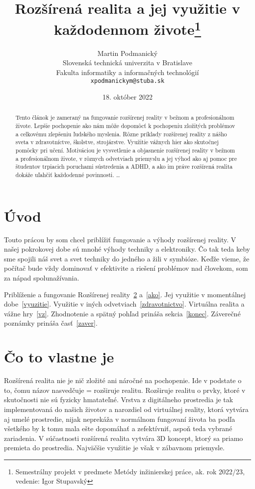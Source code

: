 \documentclass[10pt,twoside,a4paper]{article}
\title{Rozšírená realita a jej využitie v každodennom živote\thanks{Semestrálny projekt v predmete Metódy inžinierskej práce, ak. rok 2022/23, vedenie: Igor Stupavský}} %
\author{Martin Podmanický\\[2pt]
	{\small Slovenská technická univerzita v Bratislave}\\
	{\small Fakulta informatiky a informačných technológií}\\
	{\small \texttt{xpodmanickym@stuba.sk}}
	}
\date{\small 18. október 2022} %
\begin{document}
\maketitle

\begin{abstract}
Tento článok je zameraný na fungovanie rozšírenej reality v bežnom a profesionálnom živote. Lepšie pochopenie ako nám môže dopomôcť k pochopeniu zložitých problémov a celkovému zlepšeniu ľudského myslenia. Rôzne príklady rozšírenej reality z nášho sveta v zdravotníctve, školstve, strojárstve. Využitie vážnych hier ako skutočnej pomôcky pri učení. Motiváciou je vysvetlenie a objasnenie rozšírenej reality v bežnom a profesionálnom živote, v rôznych odvetviach priemyslu a jej výhod ako aj pomoc pre študentov trpiacich poruchami sústredenia a ADHD, a ako im práve rozšírená realita dokáže uľahčiť každodenné povinnosti.
\ldots
\end{abstract}



\section{Úvod}

Touto prácou by som chcel priblížiť fungovanie a výhody rozšírenej reality. V našej pokrokovej dobe sú mnohé výhody techniky a elektroniky.
Čo tak teda keby sme spojili náš svet a svet techniky do jedného a žili v symbióze. Keďže vieme, že počítač bude vždy dominovať v efektivite a riešení problémov nad človekom,
som za nápad spolunažívania.


Priblíženie a fungovanie Rozšírenej reality~\ref{co} a~\ref{ako}.
Jej využitie v momentálnej dobe~\ref{vyuzitie}.
Využitie v iných odvetviach~\ref{zdravotnictvo}.
Virtuálna realita a vážne hry~\ref{vz}.
Zhodnotenie a spätný pohľad prináša sekcia~\ref{konec}.
Záverečné poznámky prináša časť~\ref{zaver}.



\section{Čo to vlastne je} \label{co}

Rozšírená realita nie je nič zložité ani náročné na pochopenie. Ide v podstate o to, čomu názov nasvedčuje = rozširuje realitu. Rozširuje realitu o prvky, ktoré v skutočnosti nie sú fyzicky hmatateľné. Vrstva z digitálneho prostredia je tak implementovaná do našich životov a narozdiel od virtuálnej reality, ktorá vytvára aj umelé prostredie, nijak neprekáža v normálnom fungovaní života ba podľa všetkého by k tomu mala ešte dopomáhať a zefektívniť, aspoň teda vybrané zariadenia. V súčastnosti rozšírená realita vytvára  3D koncept, ktorý sa priamo premieta do prostredia. Najväčšie využitie je však v zábavnom priemysle.
\end{document}
